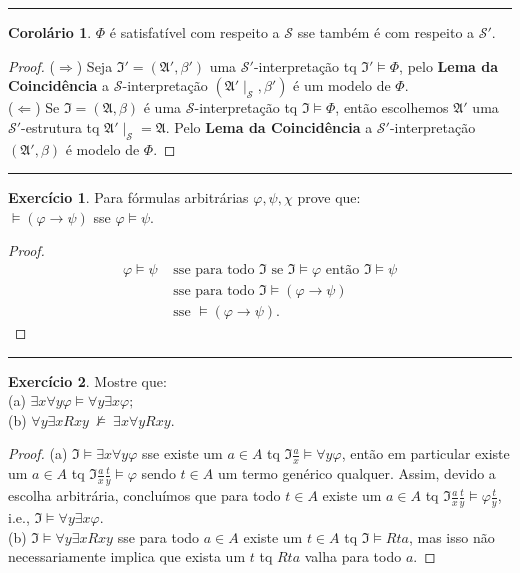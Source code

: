 \documentclass[11pt]{article}
\theoremstyle{definition}
\newtheorem{exer}{Exercício}
\newtheorem{corollary}{Corolário}
\newcommand{\mc}[1]{\mathcal{#1}}
\newcommand{\mf}[1]{\mathfrak{#1}}
\begin{document}
\hrule

\begin{corollary}
$\Phi$ é satisfatível com respeito a $\mc{S}$ sse também é com respeito a $\mc{S}'$.
\end{corollary}

\begin{proof}
($\Rightarrow$) Seja $\mf{I}'=(\mf{A}',\beta')$ uma $\mc{S}'$-interpretação tq $\mf{I}'\vDash\Phi$, pelo \textbf{Lema da Coincidência} a $\mc{S}$-interpretação $(\mf{A}'\mid_\mc{S},\beta')$ é um modelo de $\Phi$.\\
($\Leftarrow$) Se $\mf{I}=(\mf{A},\beta)$ é uma $\mc{S}$-interpretação tq $\mf{I}\vDash\Phi$, então escolhemos $\mf{A}'$ uma $\mc{S}'$-estrutura tq $\mf{A}'\mid_\mc{S}=\mf{A}$. Pelo \textbf{Lema da Coincidência} a $\mc{S}'$-interpretação $(\mf{A}',\beta)$ é modelo de $\Phi$.
\end{proof}

\hrule

\begin{exer}
Para fórmulas arbitrárias $\varphi,\psi,\chi$ prove que:\\
$\vDash(\varphi\to\psi)$ sse $\varphi\vDash\psi$.

\begin{proof}
\begin{align*}
    \varphi\vDash\psi & \text{ sse para todo }\mf{I}\text{ se }\mf{I}\vDash\varphi\text{ então }\mf{I}\vDash\psi\\
& \text{ sse para todo }\mf{I}\vDash(\varphi\to\psi)\\
& \text{ sse }\vDash(\varphi\to\psi).
\end{align*}
\end{proof}
\end{exer}

\hrule

\begin{exer}
Mostre que:\\
(a) $\exists x\forall y\varphi\vDash\forall y\exists x\varphi;$\\
(b) $\forall y\exists xRxy~\nvDash~\exists x\forall yRxy$.

\begin{proof}
(a) $\mf{I}\vDash\exists x\forall y\varphi$ sse existe um $a\in A$ tq $\mf{I}\frac{a}{x}\vDash\forall y\varphi$, então em particular existe um $a\in A$ tq $\mf{I}\frac{a}{x}\frac{t}{y}\vDash\varphi$ sendo $t\in A$ um termo genérico qualquer. Assim, devido a escolha arbitrária, concluímos que para todo $t\in A$ existe um $a\in A$ tq $\mf{I}\frac{a}{x}\frac{t}{y}\vDash\varphi\frac{t}{y}$, i.e., $\mf{I}\vDash\forall y\exists x\varphi$.\\
(b) $\mf{I}\vDash\forall y\exists xRxy$ sse para todo $a\in A$ existe um $t\in A$ tq $\mf{I}\vDash Rta$, mas isso não necessariamente implica que exista um $t$ tq $Rta$ valha para todo $a$.
\end{proof}
\end{exer}
\end{document}
